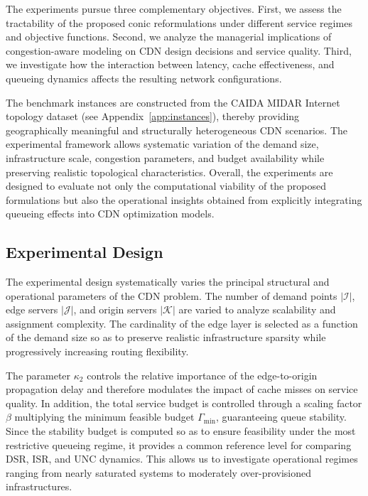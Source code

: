 \documentclass[a4paper,11pt,reqno]{amsart}
\newcommand{\K}{\mathcal{K}}
\newcommand{\I}{\mathcal{I}}
\newcommand{\J}{\mathcal{J}}
\begin{document}
The experiments pursue three complementary objectives. First, we assess the tractability of the proposed conic reformulations under different service regimes and objective functions. Second, we analyze the managerial implications of congestion-aware modeling on CDN design decisions and service quality. Third, we investigate how the interaction between latency, cache effectiveness, and queueing dynamics affects the resulting network configurations.

The benchmark instances are constructed from the CAIDA MIDAR Internet topology dataset (see Appendix~\ref{app:instances}), thereby providing geographically meaningful and structurally heterogeneous CDN scenarios. The experimental framework allows systematic variation of the demand size, infrastructure scale, congestion parameters, and budget availability while preserving realistic topological characteristics. Overall, the experiments are designed to evaluate not only the computational viability of the proposed formulations but also the operational insights obtained from explicitly integrating queueing effects into CDN optimization models.

\subsection{Experimental Design}

The experimental design systematically varies the principal structural and operational parameters of the CDN problem. The number of demand points $|\I|$, edge servers $|\J|$, and origin servers $|\K|$ are varied to analyze scalability and assignment complexity. The cardinality of the edge layer is selected as a function of the demand size so as to preserve realistic infrastructure sparsity while progressively increasing routing flexibility.

The parameter $\kappa_2$ controls the relative importance of the edge-to-origin propagation delay and therefore modulates the impact of cache misses on service quality. In addition, the total service budget is controlled through a scaling factor $\beta$ multiplying the minimum feasible budget $\Gamma_{\min}$, guaranteeing queue stability.  Since the stability budget is computed so as to ensure feasibility under the most restrictive queueing regime, it provides a common reference level for comparing DSR, ISR, and UNC dynamics. This allows us to investigate operational regimes ranging from nearly saturated systems to moderately over-provisioned infrastructures.
\end{document}
